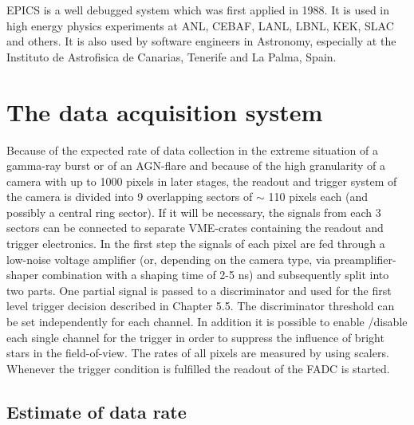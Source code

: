 EPICS is a well debugged system which was first applied in 1988. It is used
in high energy physics experiments at ANL, CEBAF, LANL, LBNL, KEK, SLAC and
others. It is also used by software engineers in Astronomy, especially at
the Instituto de Astrofisica de Canarias, Tenerife and La Palma, Spain.

\newpage
\begin{figure}[t]
\leavevmode
\begin{center}
\epsfxsize=15cm
\end{center}
\end{figure}
\newpage
\chapter{The data acquisition system}


\medskip Because of 
the expected rate of data collection in the extreme situation of
a gamma-ray burst or of an AGN-flare and because of the high granularity of
a camera with up to 1000 pixels in later stages, the readout and trigger
system of the camera is divided into 9 overlapping sectors 
of $\sim$ 110 pixels
each (and possibly a central ring sector). If it will be
necessary, the signals from each
3 sectors can be connected to separate VME-crates 
containing the readout and
trigger electronics. 
In the first step the signals of each pixel are fed through a low-noise
voltage amplifier (or, depending on the camera type, via 
preamplifier-shaper combination with a shaping time of 2-5 ns) and
subsequently split into two parts. One partial signal is passed to a
discriminator and used for the first level trigger decision described in
Chapter 5.5. The discriminator threshold can be set independently for each
channel. In addition it is possible to enable /disable each single channel
for the trigger in order to suppress the influence of bright stars in the
field-of-view. The rates of all pixels are measured by using scalers.
Whenever the trigger condition is fulfilled the readout of the FADC is
started.

\section{Estimate of data rate}


